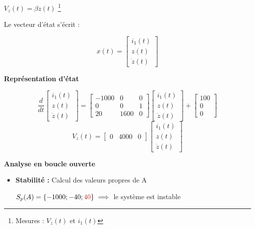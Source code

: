 {{{{\begin{center}
    \Large{$
    V_{z}(t) = \beta z(t)
    $} \footnote{Mesures : $V_{z}(t)$ et $i_{1}(t)$}
\end{center}
Le vecteur d'état s'écrit : 
\begin{center}
    \[
    x(t) = 
    \begin{bmatrix}
    i_{1}(t) \\
    z(t) \\
    \dot{z}(t)    
    \end{bmatrix}
    \]
\end{center}
\textbf{Représentation d'état}
\begin{center}
    \[
    \frac{d}{dt}
    \begin{bmatrix}
    i_{1}(t) \\
    z(t) \\
    \dot{z}(t)    
    \end{bmatrix}
    =
    \begin{bmatrix}
        -1000 & 0    & 0 \\
        0     & 0    & 1 \\
        20    & 1600 & 0
    \end{bmatrix}
    \begin{bmatrix}
        i_{1}(t) \\
        z(t) \\
        \dot{z}(t)    
    \end{bmatrix}
    +
    \begin{bmatrix}
        100 \\
        0 \\
        0
    \end{bmatrix}
    \] \newline
    \[
    V_{z}(t) = 
    \begin{bmatrix}
        0 & 4000 & 0
    \end{bmatrix}
    \begin{bmatrix}
        i_{1}(t) \\
        z(t) \\
        \dot{z}(t)    
    \end{bmatrix}
    \]
\end{center}
\newpage
\textbf{Analyse en boucle ouverte}
\newline
\begin{itemize}
    \item \textbf{Stabilité :} Calcul des valeurs propres de A \newline
    \begin{center}
        $S_{p}(A) = \{-1000;-40;\textcolor{BrickRed}{40}\} \implies$ le système est instable

\end{center}
\end{itemize}}}}}
